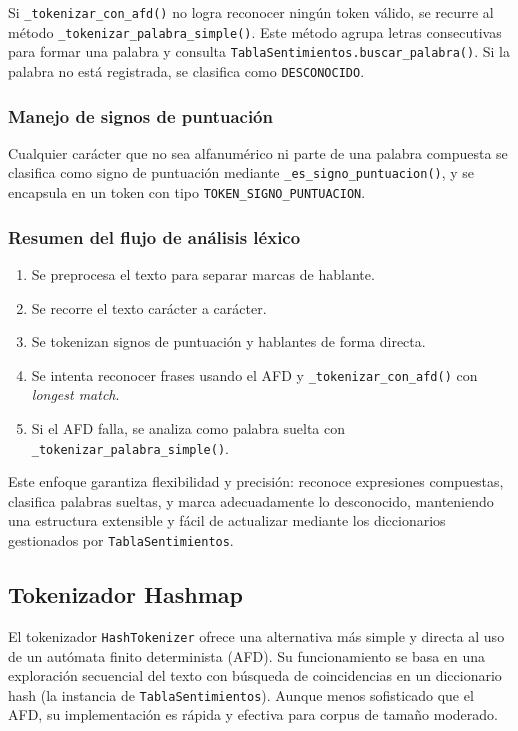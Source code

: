 Si \texttt{\_tokenizar\_con\_afd()} no logra reconocer ningún token válido, se recurre al
método \texttt{\_tokenizar\_palabra\_simple()}. Este método agrupa letras consecutivas para
formar una palabra y consulta \texttt{TablaSentimientos.buscar\_palabra()}. Si la palabra no
está registrada, se clasifica como \texttt{DESCONOCIDO}.

\subsubsection{Manejo de signos de puntuación}

Cualquier carácter que no sea alfanumérico ni parte de una palabra compuesta se clasifica como
signo de puntuación mediante \texttt{\_es\_signo\_puntuacion()}, y se encapsula en un token con
tipo \texttt{TOKEN\_SIGNO\_PUNTUACION}.

\subsubsection{Resumen del flujo de análisis léxico}

\begin{enumerate}
	\item Se preprocesa el texto para separar marcas de hablante.
	\item Se recorre el texto carácter a carácter.
	\item Se tokenizan signos de puntuación y hablantes de forma directa.
	\item Se intenta reconocer frases usando el AFD y \texttt{\_tokenizar\_con\_afd()} con \textit{longest match}.
	\item Si el AFD falla, se analiza como palabra suelta con \texttt{\_tokenizar\_palabra\_simple()}.
\end{enumerate}

Este enfoque garantiza flexibilidad y precisión: reconoce expresiones compuestas, clasifica
palabras sueltas, y marca adecuadamente lo desconocido, manteniendo una estructura extensible y
fácil de actualizar mediante los diccionarios gestionados por \texttt{TablaSentimientos}.

\subsection{Tokenizador Hashmap}

El tokenizador \texttt{HashTokenizer} ofrece una alternativa más simple y directa al uso de un
autómata finito determinista (AFD). Su funcionamiento se basa en una exploración secuencial del
texto con búsqueda de coincidencias en un diccionario hash (la instancia de
\texttt{TablaSentimientos}). Aunque menos sofisticado que el AFD, su implementación es rápida y
efectiva para corpus de tamaño moderado.

